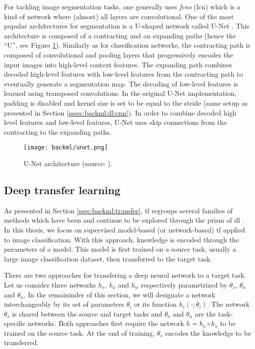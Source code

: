 For tackling image segmentation tasks, one generally uses \textit{\acrlong{fcn}s}
(\acrshort{fcn}) which is a kind of network where (almost) all layers are
convolutional. One of the most popular architectures for segmentation is a U-shaped
network called U-Net \cite{ronneberger2015unet}. This architecture is composed
of a contracting and an expanding paths (hence the ``U'', see Figure
\ref{fig:backml:unet}). Similarly as for classification networks, the contracting path is
composed of convolutional and pooling layers that progressively encodes the input
images into high-level context features. The expanding path combines decoded high-level
features with low-level features from the contracting path to eventually generate
a segmentation map. The decoding of low-level features is learned using
transposed convolutions. In the original U-Net implementation, padding is disabled and 
kernel size is set to be equal to the stride (same setup as presented in Section \ref{sssec:backml:dl:cnn}).
In order to combine decoded high level features and low-level
features, U-Net uses skip connections from the contracting to the expanding
paths.

\begin{figure}
  \centering
  \texttt{[image: backml/unet.png]}
  \caption{U-Net architecture (source: \cite{ronneberger2015unet}).}
  \label{fig:backml:unet}
\end{figure}

\subsection{Deep transfer learning}
\label{ssec:backml:dl:deeptransfer}

As presented in Section \ref{ssec:backml:transfer}, \acrlong{tl} regroups several
families of methods which have been and continue to be explored through the prism
of \acrlong{dl} \cite{tan2018survey}. In this thesis, we focus on supervised
model-based (or network-based) \acrlong{tl} applied to image classification. With
this approach, knowledge is encoded through the parameters of a model. This model
is first trained on a source task, usually a large image classification dataset,
then transferred to the target task.

There are two approaches for transfering a deep neural network to a target task.
Let us consider three networks $h_s$, $h_o$ and $h_n$ respectively parametrized
by $\theta_s$, $\theta_o$ and $\theta_n$. In the remaininder of this section, we
will designate a network interchangeably by its set of parameters $\theta_i$ or
its function $h_i(\cdot;\theta_i)$. The network $\theta_s$ is shared between the
source and target tasks and $\theta_o$ and $\theta_n$ are the task-specific
networks. Both approaches first require the network $h = h_o \circ h_s$ to be
trained on the source task. At the end of training, $\theta_s$ encodes the knowledge
to be transferred.

